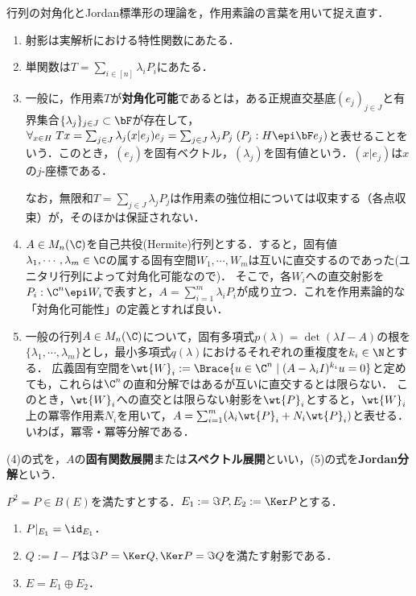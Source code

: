 \documentclass[uplatex,dvipdfmx]{jsreport}
\begin{document}
\begin{remarks}\label{remarks-diagonalizability}
    行列の対角化とJordan標準形の理論を，作用素論の言葉を用いて捉え直す．
    \begin{enumerate}
        \item 射影は実解析における特性関数にあたる．
        \item 単関数は$T=\sum_{i\in[n]}\lambda_iP_i$にあたる．
        \item 一般に，作用素$T$が\textbf{対角化可能}であるとは，ある正規直交基底$(e_j)_{j\in J}$と有界集合$\{\lambda_j\}_{j\in J}\subset\bF$が存在して，$\forall_{x\in H}\;Tx=\sum_{j\in J}\lambda_j(x|e_j)e_j=\sum_{j\in J}\lambda_jP_j\;(P_j:H\epi\bF e_j)$と表せることをいう．このとき，$(e_j)$を固有ベクトル，$(\lambda_j)$を固有値という．$(x|e_j)$は$x$の$j$-座標である．
        
        なお，無限和$T=\sum_{j\in J}\lambda_jP_j$は作用素の強位相については収束する（各点収束）が，そのほかは保証されない．
        \item $A\in M_n(\C)$を自己共役(Hermite)行列とする．すると，固有値$\lambda_1,\cdots,\lambda_m\in\C$の属する固有空間$W_1,\cdots,W_m$は互いに直交するのであった(ユニタリ行列によって対角化可能なので)．
        そこで，各$W_i$への直交射影を$P_i:\C^n\epi W_i$で表すと，$A=\sum^m_{i=1}\lambda_iP_i$が成り立つ．これを作用素論的な「対角化可能性」の定義とすれば良い．
        \item 一般の行列$A\in M_n(\C)$について，固有多項式$p(\lambda)=\det(\lambda I-A)$の根を$\{\lambda_1,\cdots,\lambda_m\}$とし，最小多項式$q(\lambda)$におけるそれぞれの重複度を$k_i\in\N$とする．
        広義固有空間を$\wt{W}_i:=\Brace{u\in\C^n\mid(A-\lambda_i I)^{k_i}u=0}$と定めても，これらは$\C^n$の直和分解ではあるが互いに直交するとは限らない．
        このとき，$\wt{W}_i$への直交とは限らない射影を$\wt{P}_i$とすると，$\wt{W}_i$上の冪零作用素$N_i$を用いて，$A=\sum_{i=1}^m(\lambda_i\wt{P}_i+N_i\wt{P}_i)$と表せる．いわば，冪零・冪等分解である．
    \end{enumerate}
    (4)の式を，$A$の\textbf{固有関数展開}または\textbf{スペクトル展開}といい，(5)の式を\textbf{Jordan分解}という．
\end{remarks}

\begin{lemma}[一般の射影の性質]\label{lemma-property-of-projection}
    $P^2=P\in B(E)$を満たすとする．$E_1:=\Im P,E_2:=\Ker P$とする．
    \begin{enumerate}
        \item $P|_{E_1}=\id_{E_1}$．
        \item $Q:=I-P$は$\Im P=\Ker Q,\Ker P=\Im Q$を満たす射影である．
        \item $E=E_1\oplus E_2$．
    \end{enumerate}
\end{lemma}
\end{document}
